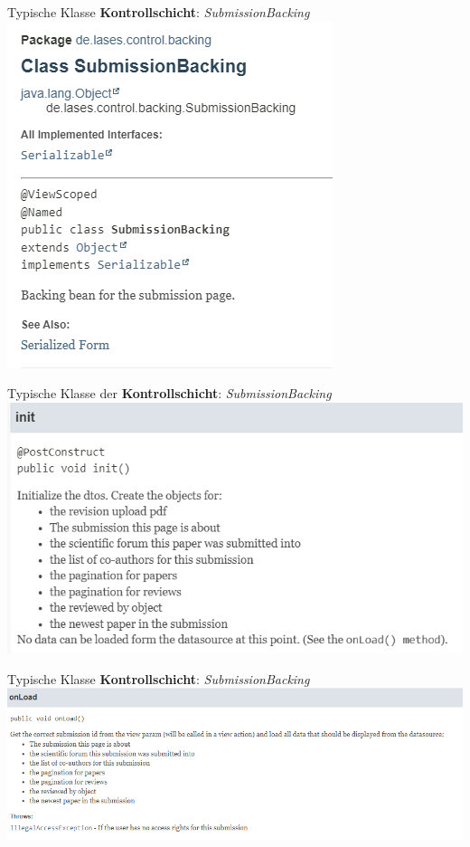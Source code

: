 \documentclass{beamer}
\begin{document}
    \begin{frame}{Typische Klasse \textbf{Kontrollschicht}: \emph{SubmissionBacking}}
        \centering
        \includegraphics[height=0.7\textheight]{graphics/backing/doc_backing}
    \end{frame}
    \begin{frame}{Typische Klasse der \textbf{Kontrollschicht}: \emph{SubmissionBacking}}
        \centering
        \includegraphics[height=0.6\textheight]{graphics/backing/doc_init}
    \end{frame}
    \begin{frame}{Typische Klasse \textbf{Kontrollschicht}: \emph{SubmissionBacking}}
        \centering
        \includegraphics[height=0.5\textheight]{graphics/backing/doc_onLoad}
    \end{frame}
\end{document}
